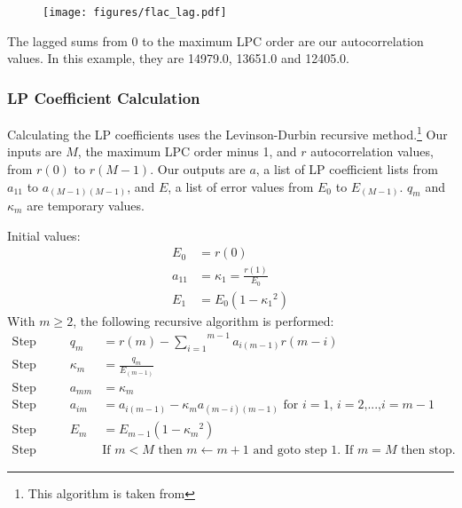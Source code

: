 \begin{figure}[h]
\texttt{[image: figures/flac\_lag.pdf]}
\end{figure}

The lagged sums from 0 to the maximum LPC order are our autocorrelation
values.  In this example, they are 14979.0, 13651.0 and 12405.0.

\subsubsection{LP Coefficient Calculation}

Calculating the LP coefficients uses the Levinson-Durbin recursive method.\footnote{This algorithm is taken from  }
Our inputs are $M$, the maximum LPC order minus 1, and $r$ autocorrelation
values, from $r(0)$ to $r(M - 1)$.
Our outputs are $a$, a list of LP coefficient lists from
$a_{11}$ to $a_{(M - 1)(M - 1)}$, and $E$, a list
of error values from $E_0$ to $E_{(M - 1)}$.
$q_m$ and $\kappa_m$ are temporary values.
\par
\noindent
Initial values:
\begin{align}
E_0 &= r(0) \\
a_{11} &= \kappa_1 = \frac{r(1)}{E_0} \\
E_1 &= E_0 {(1 - {{\kappa_1} ^ 2})}
\end{align}
\noindent
With $m \geq 2$, the following recursive algorithm is performed:
\begin{align}
\text{Step 1. } && q_m &= r(m) - \overset{m - 1}{\underset{i = 1}{\sum}} a_{i(m - 1)}r(m - i) \\
\text{Step 2. } && \kappa_m &= \frac{q_m}{E_{(m - 1)}} \\
\text{Step 3. } && a_{mm} &= \kappa_m \\
\text{Step 4. } && a_{im} &= a_{i(m - 1)} - \kappa_m a_{(m - i)(m - 1)} \text{ for $i = 1$, $i = 2$,...,$i = m - 1$} \\
\text{Step 5. } && E_m &= E_{m - 1}(1 - {\kappa_m} ^ 2) \\
\text{Step 6. } &&& \text{If $m < M$ then $m \leftarrow m + 1$ and goto step 1.  If $m = M$ then stop.}
\end{align}


